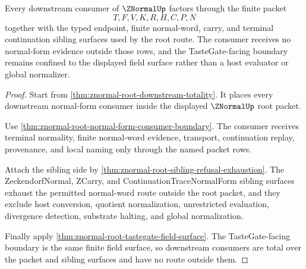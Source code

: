 \begin{theorem}
\label{thm:znormal-consumer-route-totality}
Every downstream consumer of $\ZNormalUp$ factors through the finite packet
$$
T,F,V,K,R,H,C,P,N
$$
together with the typed endpoint, finite normal-word, carry, and terminal continuation sibling surfaces used by the root route. The consumer receives no normal-form evidence outside those rows, and the TasteGate-facing boundary remains confined to the displayed field surface rather than a host evaluator or global normalizer.
\end{theorem}
\begin{proof}
Start from \autoref{thm:znormal-root-downstream-totality}. It places every downstream normal-form consumer inside the displayed $\ZNormalUp$ root packet.

Use \autoref{thm:znormal-root-normal-form-consumer-boundary}. The consumer receives terminal normality, finite normal-word evidence, transport, continuation replay, provenance, and local naming only through the named packet rows.

Attach the sibling side by \autoref{thm:znormal-root-sibling-refusal-exhaustion}. The ZeckendorfNormal, ZCarry, and ContinuationTraceNormalForm sibling surfaces exhaust the permitted normal-word route outside the root packet, and they exclude host conversion, quotient normalization, unrestricted evaluation, divergence detection, substrate halting, and global normalization.

Finally apply \autoref{thm:znormal-root-tastegate-field-surface}. The TasteGate-facing boundary is the same finite field surface, so downstream consumers are total over the packet and sibling surfaces and have no route outside them.
\end{proof}

